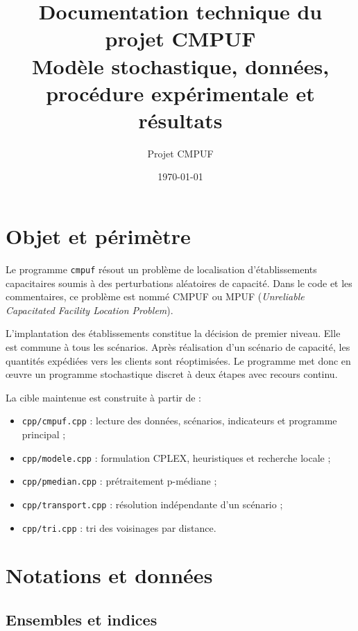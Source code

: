 \documentclass[11pt,a4paper]{article}
\title{Documentation technique du projet CMPUF\\
\large Modèle stochastique, données, procédure expérimentale et résultats}
\author{Projet CMPUF}
\date{\today}
\newcommand{\code}[1]{\texttt{#1}}
\begin{document}
\maketitle
\tableofcontents
\newpage

\section{Objet et périmètre}

Le programme \code{cmpuf} résout un problème de localisation
d'établissements capacitaires soumis à des perturbations aléatoires de
capacité. Dans le code et les commentaires, ce problème est nommé CMPUF ou
MPUF (\emph{Unreliable Capacitated Facility Location Problem}).

L'implantation des établissements constitue la décision de premier niveau.
Elle est commune à tous les scénarios. Après réalisation d'un scénario de
capacité, les quantités expédiées vers les clients sont réoptimisées. Le
programme met donc en œuvre un programme stochastique discret à deux étapes
avec recours continu.

La cible maintenue est construite à partir de :
\begin{itemize}
  \item \code{cpp/cmpuf.cpp} : lecture des données, scénarios, indicateurs et
        programme principal ;
  \item \code{cpp/modele.cpp} : formulation CPLEX, heuristiques et recherche
        locale ;
  \item \code{cpp/pmedian.cpp} : prétraitement p-médiane ;
  \item \code{cpp/transport.cpp} : résolution indépendante d'un scénario ;
  \item \code{cpp/tri.cpp} : tri des voisinages par distance.
\end{itemize}

\section{Notations et données}

\subsection{Ensembles et indices}
\end{document}
